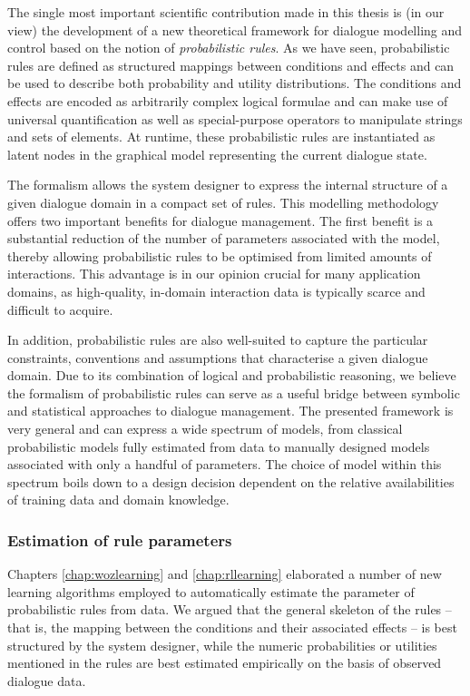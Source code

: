 The single most important scientific contribution made in this thesis is (in our view) the development of a new theoretical framework for dialogue modelling and control based on the notion of \textit{probabilistic rules}.  As we have seen, probabilistic rules are defined as structured mappings between conditions and effects and can be used to describe both probability and utility distributions.  The conditions and effects are encoded as arbitrarily complex logical formulae and can make use of universal quantification as well as special-purpose operators to manipulate strings and sets of elements. At runtime, these probabilistic rules are instantiated as latent nodes in the graphical model representing the current dialogue state.  

The formalism allows the system designer to express the internal structure of a given dialogue domain in a compact set of rules. This modelling methodology offers two important benefits for dialogue management.  The first benefit is a substantial reduction of the number of parameters associated with the model, thereby allowing probabilistic rules to be optimised from limited amounts of interactions. This advantage is in our opinion crucial for many application domains, as high-quality, in-domain interaction data is typically scarce and difficult to acquire.

In addition, probabilistic rules are also well-suited to capture the particular constraints, conventions and assumptions that characterise a given dialogue domain.  Due to its combination of logical and probabilistic reasoning, we believe the formalism of probabilistic rules can serve as a useful bridge between symbolic and statistical approaches to dialogue management.  The presented framework is very general and can express a wide spectrum of models, from classical probabilistic models fully estimated from data to manually designed models associated with only a handful of parameters. The choice of model within this spectrum boils down to a design decision dependent on the relative availabilities of training data and domain knowledge.


\subsubsection*{Estimation of rule parameters}
Chapters \ref{chap:wozlearning} and \ref{chap:rllearning} elaborated a number of new learning algorithms employed to automatically estimate the parameter of probabilistic rules from data. We argued that the general skeleton of the rules -- that is, the mapping between the conditions and their associated effects -- is best structured by the system designer, while the numeric probabilities or utilities mentioned in the rules are best estimated empirically on the basis of observed dialogue data. 

